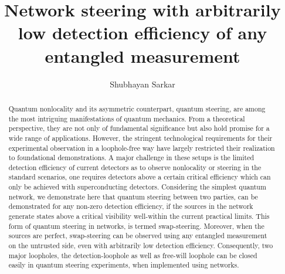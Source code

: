 \documentclass[pra,twocolumn,showpacs]{revtex4-2}
\theoremstyle{plain}
\theoremstyle{definition}
\theoremstyle{remark}
\begin{document}
\title{Network steering with arbitrarily low detection efficiency of any entangled measurement}
\author{Shubhayan Sarkar}






\begin{abstract}	
Quantum nonlocality and its asymmetric counterpart, quantum steering, are among the most intriguing manifestations of quantum mechanics. From a theoretical perspective, they are not only of fundamental significance but also hold promise for a wide range of applications. However, the stringent technological requirements for their experimental observation in a loophole-free way have largely restricted their realization to foundational demonstrations. A major challenge in these setups is the limited detection efficiency of current detectors as to observe nonlocality or steering in the standard scenarios, one requires detectors above a certain critical efficiency which can only be achieved with superconducting detectors. Considering the simplest quantum network, we demonstrate here that quantum steering between two parties, can be demonstrated for any non-zero detection efficiency, if the sources in the network generate states above a critical visibility well-within the current practical limits. This form of quantum steering in networks, is termed swap-steering. Moreover, when the sources are perfect, swap-steering can be observed using any entangled measurement on the untrusted side, even with arbitrarily low detection efficiency. Consequently, two major loopholes, the detection-loophole as well as free-will loophole can be closed easily in quantum steering experiments, when implemented using networks.
%
\end{abstract}


\maketitle
\end{document}

